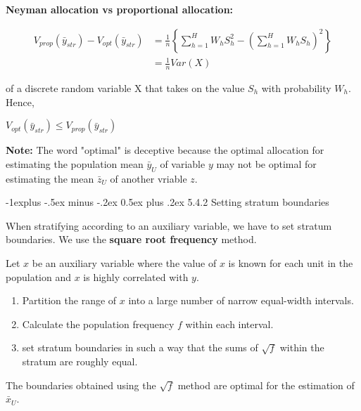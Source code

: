 \documentclass[10pt,landscape]{article}
\makeatletter
\renewcommand{\subsection}{\@startsection{subsection}{2}{0mm}%
                                {-1explus -.5ex minus -.2ex}%
                                {0.5ex plus .2ex}%
                                {\normalfont\normalsize\bfseries}}
\makeatother
\begin{document}
\begin{multicols}{3}
\textbf{Neyman allocation vs proportional allocation:}

\begin{equation}
  \begin{split}
    V_{prop}(\bar{y}_{str}) - V_{opt}(\bar{y}_{str}) &= \frac{1}{n}\left\{\sum_{h=1}^{H}W_{h}S_{h}^{2}-\left(\sum_{h=1}^{H}W_{h}S_{h}\right)^{2}\right\} \\
    &= \frac{1}{n}Var(X)
  \end{split}
\end{equation}

of a discrete random variable X that takes on the value $S_{h}$ with probability $W_{h}$. Hence,

\begin{center}
  $V_{opt}(\bar{y}_{str}) \leq V_{prop}(\bar{y}_{str})$
\end{center}

\textbf{Note:} The word "optimal" is deceptive because the optimal allocation for estimating the population mean $\bar{y}_{U}$ of variable $y$ may not be optimal for estimating the mean $\bar{z}_{U}$ of another vriable $z$.

\subsection{5.4.2 Setting stratum boundaries}

When stratifying according to an auxiliary variable, we have to set stratum boundaries. We use the \textbf{square root frequency} method.

\vspace{5}

Let $x$ be an auxiliary variable where the value of $x$ is known for each unit in the population and $x$ is highly correlated with $y$.

\begin{enumerate}
  \item Partition the range of $x$ into a large number of narrow equal-width intervals.
  \item Calculate the population frequency $f$ within each interval.
  \item set stratum boundaries in such a way that the sums of $\sqrt{f}$ within the stratum are roughly equal.
\end{enumerate}

The boundaries obtained using the $\sqrt{f}$ method are optimal for the estimation of $\bar{x}_{U}$.

\vspace{5}


\end{multicols}
\end{document}
